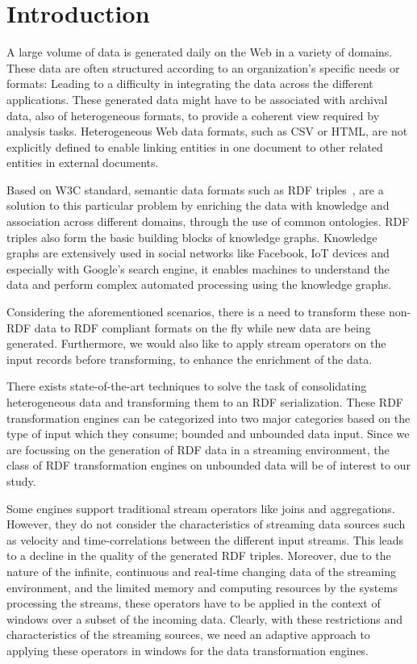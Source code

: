 \chapter{Introduction}
\label{chap:intro}

A large volume of data is generated daily on the Web in a variety of domains. These
data are often structured according to an organization's specific needs or formats: Leading to
a difficulty in integrating the data across the different applications.
These generated data might have to be associated with archival data, also of heterogeneous formats,
to provide a coherent view required by analysis tasks. Heterogeneous Web data formats, such as CSV or HTML, are not explicitly
defined to enable linking entities in one document to other related entities in external documents.

Based on W3C standard, semantic data formats such as RDF triples~\cite{intro_rdf}, are a solution to
this particular problem by enriching the data with knowledge and association across
different domains, through the use of common ontologies. RDF triples also form the basic building blocks of knowledge graphs.
Knowledge graphs are extensively used in social networks like Facebook\cite{facebook_linked_data}, IoT devices\cite{graph_of_things} and especially with Google's search
engine\cite{google_kg}, it enables machines to understand the data and perform complex automated processing
using the knowledge graphs. 

Considering the aforementioned scenarios, there is a need to transform these non-RDF data to RDF compliant formats on the fly while
new data are being generated. Furthermore, we would also like to apply stream operators on the input records
before transforming, to enhance the enrichment of the data.

There exists state-of-the-art techniques to solve the task of consolidating heterogeneous data
and transforming them to an RDF serialization. These RDF transformation engines can be categorized into two major categories based on the type of input
which they consume; bounded and unbounded data input. Since we are focussing on the generation of RDF data
in a streaming environment, the class of RDF transformation engines on unbounded data will be of interest to our study.

Some engines support traditional stream operators like joins and aggregations. However, they do not consider
the characteristics of streaming data sources such as velocity and time-correlations between the different
input streams. This leads to a decline in the quality of the generated RDF triples. Moreover,
due to the nature of the infinite, continuous and real-time changing data of the streaming environment, and 
the limited memory and computing resources by the systems processing the streams, 
these operators have to be applied in the context of windows over a subset of the incoming data.
Clearly, with these restrictions and characteristics of the streaming sources, we need an adaptive approach
to applying these operators in windows for the data transformation engines. 

